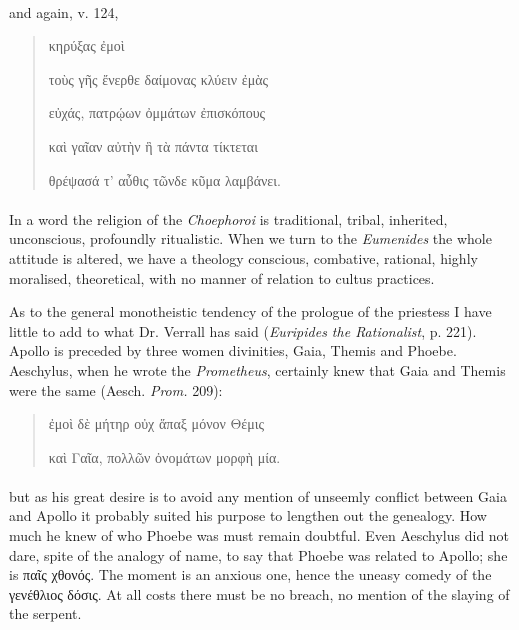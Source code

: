 \documentclass[a4paper, 11pt, oneside, polutonikogreek, english]{article}
\begin{document}
\paragraph{}
and again, v. 124,
\begin{quotation}
\large
\hspace*{20mm}κηρύξας ἐμοὶ

τοὺς γῆς ἔνερθε δαίμονας κλύειν ἐμὰς

εὐχάς, πατρῴων ὀμμάτων ἐπισκόπους

καὶ γαῖαν αὐτὴν ἣ τὰ πάντα τίκτεται

θρέψασά τ' αὖθις τῶνδε κῦμα λαμβάνει.
\end{quotation}
\paragraph{}
In a word the religion of the \emph{Choephoroi} is traditional, tribal, inherited, unconscious, profoundly ritualistic. When we turn to the \emph{Eumenides} the whole attitude is altered, we have a theology conscious, combative, rational, highly moralised, theoretical, with no manner of relation to cultus practices.

As to the general monotheistic tendency of the prologue of the priestess I have little to add to what Dr. Verrall has said (\emph{Euripides the Rationalist}, p. 221). Apollo is preceded by three women divinities, Gaia, Themis and Phoebe. Aeschylus, when he wrote the \emph{Prometheus}, certainly knew that Gaia and Themis were the same (Aesch. \emph{Prom.} 209):
\begin{quotation}
\large
ἐμοὶ δὲ μήτηρ οὐχ ἅπαξ μόνον Θέμις

καὶ Γαῖα, πολλῶν ὀνομάτων μορφὴ μία.
\end{quotation}
\paragraph{}
but as his great desire is to avoid any mention of unseemly conflict between Gaia and Apollo it probably suited his purpose to lengthen out the genealogy. How much he knew of who Phoebe was must remain doubtful. Even Aeschylus did not dare, spite of the analogy of name, to say that Phoebe was related to Apollo; she is παῖς χθονός. The moment is an anxious one, hence the uneasy comedy of the γενέθλιος δόσις. At all costs there must be no breach, no mention of the slaying of the serpent.
\end{document}
